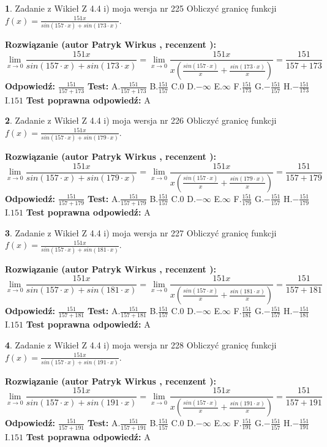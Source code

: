 \documentclass[12pt, a4paper]{article}
\theoremstyle{definition} %
\newtheorem{zad}{}
\newcommand{\zadStart}[1]{\begin{zad}#1\newline}
\newcommand{\zadStop}{\end{zad}}
\newcommand{\rozwStart}[2]{\noindent \textbf{Rozwiązanie (autor #1 , recenzent #2): }\newline}
\newcommand{\rozwStop}{\newline}
\newcommand{\odpStart}{\noindent \textbf{Odpowiedź:}\newline}
\newcommand{\odpStop}{\newline}
\newcommand{\testStart}{\noindent \textbf{Test:}\newline}
\newcommand{\testStop}{\newline}
\newcommand{\kluczStart}{\noindent \textbf{Test poprawna odpowiedź:}\newline}
\newcommand{\kluczStop}{\newline}
\begin{document}
\zadStart{Zadanie z Wikieł Z 4.4 i) moja wersja nr 225}
Obliczyć granicę funkcji $f(x)=\frac{151x}{sin(157\cdot x) +sin(173\cdot x)}$.
\zadStop
\rozwStart{Patryk Wirkus}{}
$$\lim\limits_{x\to 0}\frac{151x}{sin(157\cdot x) +sin(173\cdot x)}=\lim\limits_{x\to 0}\frac{151x}{x(\frac{sin(157\cdot x)}{x}+\frac{sin(173\cdot x)}{x})}=\frac{151}{157+173}$$
\rozwStop
\odpStart
$\frac{151}{157+173}$
\odpStop
\testStart
A.$\frac{151}{157+173}$
B.$\frac{151}{157}$
C.$0$
D.$-\infty$
E.$\infty$
F.$\frac{151}{173}$
G.$-\frac{151}{157}$
H.$-\frac{151}{173}$
I.$151$
\testStop
\kluczStart
A
\kluczStop



\zadStart{Zadanie z Wikieł Z 4.4 i) moja wersja nr 226}
Obliczyć granicę funkcji $f(x)=\frac{151x}{sin(157\cdot x) +sin(179\cdot x)}$.
\zadStop
\rozwStart{Patryk Wirkus}{}
$$\lim\limits_{x\to 0}\frac{151x}{sin(157\cdot x) +sin(179\cdot x)}=\lim\limits_{x\to 0}\frac{151x}{x(\frac{sin(157\cdot x)}{x}+\frac{sin(179\cdot x)}{x})}=\frac{151}{157+179}$$
\rozwStop
\odpStart
$\frac{151}{157+179}$
\odpStop
\testStart
A.$\frac{151}{157+179}$
B.$\frac{151}{157}$
C.$0$
D.$-\infty$
E.$\infty$
F.$\frac{151}{179}$
G.$-\frac{151}{157}$
H.$-\frac{151}{179}$
I.$151$
\testStop
\kluczStart
A
\kluczStop



\zadStart{Zadanie z Wikieł Z 4.4 i) moja wersja nr 227}
Obliczyć granicę funkcji $f(x)=\frac{151x}{sin(157\cdot x) +sin(181\cdot x)}$.
\zadStop
\rozwStart{Patryk Wirkus}{}
$$\lim\limits_{x\to 0}\frac{151x}{sin(157\cdot x) +sin(181\cdot x)}=\lim\limits_{x\to 0}\frac{151x}{x(\frac{sin(157\cdot x)}{x}+\frac{sin(181\cdot x)}{x})}=\frac{151}{157+181}$$
\rozwStop
\odpStart
$\frac{151}{157+181}$
\odpStop
\testStart
A.$\frac{151}{157+181}$
B.$\frac{151}{157}$
C.$0$
D.$-\infty$
E.$\infty$
F.$\frac{151}{181}$
G.$-\frac{151}{157}$
H.$-\frac{151}{181}$
I.$151$
\testStop
\kluczStart
A
\kluczStop



\zadStart{Zadanie z Wikieł Z 4.4 i) moja wersja nr 228}
Obliczyć granicę funkcji $f(x)=\frac{151x}{sin(157\cdot x) +sin(191\cdot x)}$.
\zadStop
\rozwStart{Patryk Wirkus}{}
$$\lim\limits_{x\to 0}\frac{151x}{sin(157\cdot x) +sin(191\cdot x)}=\lim\limits_{x\to 0}\frac{151x}{x(\frac{sin(157\cdot x)}{x}+\frac{sin(191\cdot x)}{x})}=\frac{151}{157+191}$$
\rozwStop
\odpStart
$\frac{151}{157+191}$
\odpStop
\testStart
A.$\frac{151}{157+191}$
B.$\frac{151}{157}$
C.$0$
D.$-\infty$
E.$\infty$
F.$\frac{151}{191}$
G.$-\frac{151}{157}$
H.$-\frac{151}{191}$
I.$151$
\testStop
\kluczStart
A
\kluczStop
\end{document}
